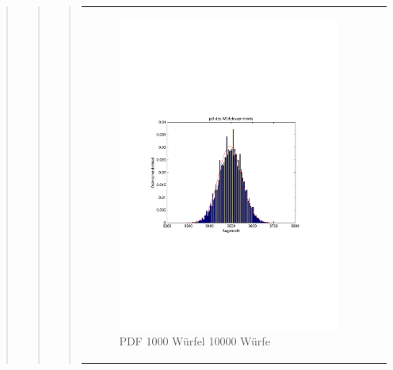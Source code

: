 \begin{quote}
\begin{quote}
\begin{quote}
\begin{center}
\begin{tabular}{ll}
            \hspace{-28em}
                \begin{minipage}{0.6\textwidth}

                    \begin{figure}[H]
                        \label{fig:}
                        \includegraphics[scale=0.6, trim = 3cm 8.5cm 3.5cm 8.5cm, clip]{./Bilder/1000wuerfelpdf} %
                        \caption{PDF 1000 Würfel 10000 Würfe}
                    \end{figure}

                \end{minipage}

            \end{tabular}
            \end{center}
    \end{quote}	
    

\end{quote}
\end{quote}
